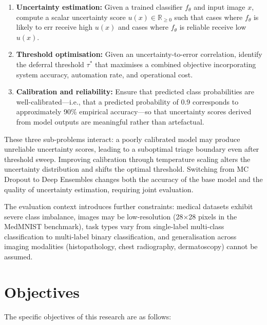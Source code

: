 \begin{enumerate}
    \item \textbf{Uncertainty estimation:} Given a trained classifier $f_\theta$ and input image $x$, compute a scalar uncertainty score $u(x) \in \mathbb{R}_{\geq 0}$ such that cases where $f_\theta$ is likely to err receive high $u(x)$ and cases where $f_\theta$ is reliable receive low $u(x)$.

    \item \textbf{Threshold optimisation:} Given an uncertainty-to-error correlation, identify the deferral threshold $\tau^*$ that maximises a combined objective incorporating system accuracy, automation rate, and operational cost.

    \item \textbf{Calibration and reliability:} Ensure that predicted class probabilities are well-calibrated—i.e., that a predicted probability of 0.9 corresponds to approximately 90\% empirical accuracy—so that uncertainty scores derived from model outputs are meaningful rather than artefactual.
\end{enumerate}

These three sub-problems interact: a poorly calibrated model may produce unreliable uncertainty scores, leading to a suboptimal triage boundary even after threshold sweep. Improving calibration through temperature scaling alters the uncertainty distribution and shifts the optimal threshold. Switching from MC Dropout to Deep Ensembles changes both the accuracy of the base model and the quality of uncertainty estimation, requiring joint evaluation.

The evaluation context introduces further constraints: medical datasets exhibit severe class imbalance, images may be low-resolution (28$\times$28 pixels in the MedMNIST benchmark), task types vary from single-label multi-class classification to multi-label binary classification, and generalisation across imaging modalities (histopathology, chest radiography, dermatoscopy) cannot be assumed.

\section{Objectives}

The specific objectives of this research are as follows:

